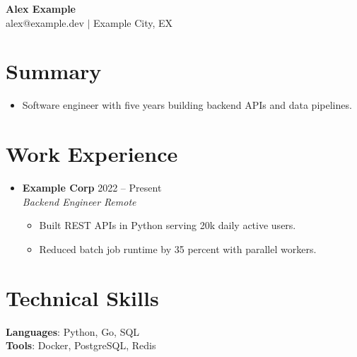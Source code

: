 \documentclass[letterpaper,11pt]{article}
\newcommand{\resumeItem}[1]{\item\small{#1}}
\newcommand{\resumeSubheading}[4]{%
  \item
  \textbf{#1} \hfill #2 \\
  \textit{#3} \hfill \textit{#4}%
}
\newcommand{\resumeItemListStart}{\begin{itemize}[leftmargin=0.15in]}
\newcommand{\resumeItemListEnd}{\end{itemize}}
\begin{document}
\begin{center}
  {\LARGE\bfseries Alex Example}\\[2pt]
  \small alex@example.dev $|$ Example City, EX
\end{center}

\section{Summary}
\resumeItemListStart
  \resumeItem{Software engineer with five years building backend APIs and data pipelines.}
\resumeItemListEnd

\section{Work Experience}
\resumeItemListStart
  \resumeSubheading{Example Corp}{2022 -- Present}{Backend Engineer}{Remote}
  \resumeItemListStart
    \resumeItem{Built REST APIs in Python serving 20k daily active users.}
    \resumeItem{Reduced batch job runtime by 35 percent with parallel workers.}
  \resumeItemListEnd
\resumeItemListEnd

\section{Technical Skills}
\begin{itemize}[leftmargin=0.15in]
  \small{\item{
    \textbf{Languages}{: Python, Go, SQL} \\
    \textbf{Tools}{: Docker, PostgreSQL, Redis} \\
  }}
\end{itemize}
\end{document}
